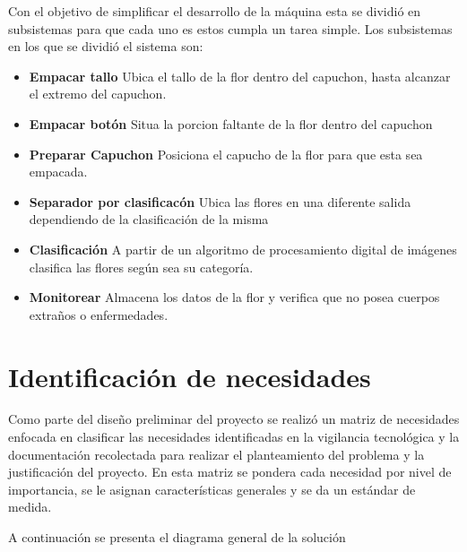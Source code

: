 

\minitoc

Con el objetivo de simplificar el desarrollo de la máquina esta se dividió en subsistemas para que cada uno es estos cumpla un tarea simple. Los subsistemas en los que se dividió el sistema son:
\begin{itemize}
	\item \textbf{Empacar tallo}
		Ubica el tallo de la flor dentro del capuchon, hasta alcanzar el extremo del capuchon.
	\item \textbf{Empacar botón}
		Situa la porcion faltante de la flor dentro del capuchon 
	\item \textbf{Preparar Capuchon}
		Posiciona el capucho de la flor para que esta sea empacada.
	\item \textbf{Separador por clasificacón}
		Ubica las flores en una diferente salida dependiendo de la clasificación de la misma
	\item \textbf{Clasificación}
		A partir de un algoritmo de procesamiento digital de imágenes clasifica las flores según sea su categoría.
	\item \textbf{Monitorear}
		Almacena los datos de la flor y verifica que no posea cuerpos extraños o enfermedades.
\end{itemize}


\section{Identificación de necesidades }
Como parte del diseño preliminar del proyecto se realizó un matriz de necesidades enfocada en clasificar las necesidades identificadas en la vigilancia tecnológica y la documentación recolectada para realizar el planteamiento del problema y la justificación del proyecto. En esta matriz se pondera cada necesidad por nivel de importancia, se le asignan características generales y se da un estándar de medida.

A continuación se presenta el diagrama general de la solución

